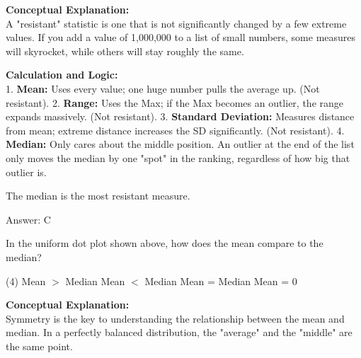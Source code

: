 \documentclass[11pt,paper=a4,answers]{exam}
\begin{document}
\begin{questions}
\begin{solution}
\textbf{Conceptual Explanation:} \\
A "resistant" statistic is one that is not significantly changed by a few extreme values. If you add a value of 1,000,000 to a list of small numbers, some measures will skyrocket, while others will stay roughly the same.

\vspace{30pt}

\textbf{Calculation and Logic:} \\
1. \textbf{Mean:} Uses every value; one huge number pulls the average up. (Not resistant).
2. \textbf{Range:} Uses the Max; if the Max becomes an outlier, the range expands massively. (Not resistant).
3. \textbf{Standard Deviation:} Measures distance from mean; extreme distance increases the SD significantly. (Not resistant).
4. \textbf{Median:} Only cares about the middle position. An outlier at the end of the list only moves the median by one "spot" in the ranking, regardless of how big that outlier is.

\vspace{20pt}

The median is the most resistant measure.

\vspace{30pt}

Answer: \colorbox{yellow!100}{C}
\end{solution}

\vspace{60pt}

\question
\begin{center}
\end{center}
In the uniform dot plot shown above, how does the mean compare to the median?
\begin{tasks}(4)
    \task Mean $>$ Median
    \task Mean $<$ Median
    \task Mean = Median
    \task Mean = 0
\end{tasks}

\begin{solution}
\textbf{Conceptual Explanation:} \\
Symmetry is the key to understanding the relationship between the mean and median. In a perfectly balanced distribution, the "average" and the "middle" are the same point.


\end{solution}
\end{questions}
\end{document}

